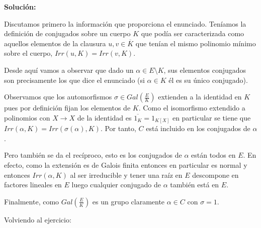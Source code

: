 \documentclass{article}
\theoremstyle{theorem-style}  %
\theoremstyle{definition-style}
\theoremstyle{example-style}
\begin{document}
\textbf{Solución:}

Discutamos primero la información que proporciona el enunciado. Teníamos la definición de conjugados sobre un cuerpo $K$ que podía ser caracterizada como aquellos elementos de la clausura $u,v \in \overline{K}$ que tenían el mismo polinomio mínimo sobre el cuerpo, $Irr(u,K) = Irr(v,K)$.

Desde aquí vamos a observar que dado un $\alpha \in E \setminus K$, sus elementos conjugados son precisamente los que dice el enunciado (si $\alpha \in K$ él es su único conjugado). 

Observamos que los automorfismos $\sigma \in Gal(\frac{E}{K})$ extienden a la identidad en $K$ pues por definición fijan los elementos de $K$. Como el isomorfismo extendido a polinomios con $X \to X$ de la identidad es $\overline{1_K} = 1_{K[X]}$ en particular se tiene que $Irr(\alpha,K) = Irr(\sigma(\alpha),K)$. Por tanto, $C$ está incluido en los conjugados de $\alpha$. 

Pero también se da el recíproco, esto es los conjugados de $\alpha$ están todos en $E$. En efecto, como la extensión es de Galois finita entonces en particular es normal y entonces $Irr(\alpha,K)$ al ser irreducible y tener una raíz en $E$ descompone en factores lineales en $E$ luego cualquier conjugado de $\alpha$ también está en $E$. 

Finalmente, como $Gal(\frac{E}{K})$ es un grupo claramente $\alpha \in C$ con $\sigma = 1$. 

Volviendo al ejercicio:
\end{document}
